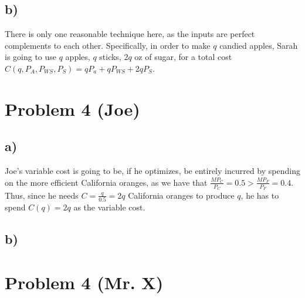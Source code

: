 \documentclass[12pt,letterpaper]{article}
\theoremstyle{definition}
\begin{document}
\subsection*{b)}
There is only one reasonable technique here, as the inputs are perfect
complements to each other. Specifically, in order to make $q$ candied apples, Sarah is
going to use $q$ apples, $q$ sticks, $2q$ oz of sugar, for a total cost
$C(q,P_A,P_{WS},P_S) = qP_a + qP_{WS} + 2qP_S$.

\section*{Problem 4 (Joe)}

\subsection*{a)}
Joe's variable cost is going to be, if he optimizes, be entirely incurred by
spending on the more efficient California oranges, as we have that $\frac{MP_C}{P_C} = 0.5 >
\frac{MP_F}{P_F} = 0.4$. Thus, since he needs $C = \frac{q}{0.5} = 2q$
California oranges to produce $q$, he has to spend $C(q) = 2q$ as the variable cost.

\subsection*{b)}

\begin{center}
\end{center}

\section*{Problem 4 (Mr. X)}
\end{document}
